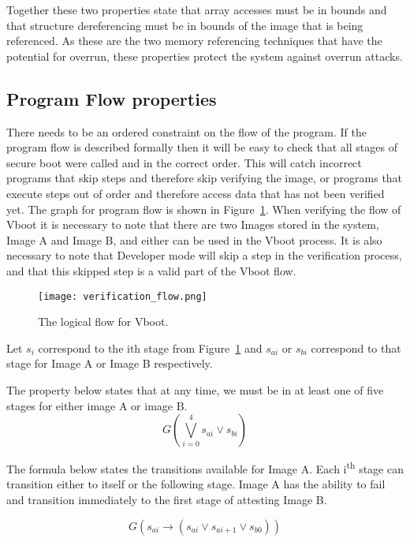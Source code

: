 Together these two properties state that array accesses must be in bounds and that structure dereferencing must be in bounds of the image that is being referenced.
As these are the two memory referencing techniques that have the potential for overrun, these properties protect the system against overrun attacks.

\subsection{Program Flow properties}


There needs to be an ordered constraint on the flow of the program. 
If the program flow is described formally then it will be easy to check that all stages of secure boot were called and in the correct order.
This will catch incorrect programs that skip steps and therefore skip verifying the image, or programs that execute steps out of order and therefore access data that has not been verified yet.
The graph for program flow is shown in Figure~\ref{fig:v_flow}.
When verifying the flow of Vboot it is necessary to note that there are two Images stored in the system, Image A and Image B, and either can be used in the Vboot process. 
It is also necessary to note that Developer mode will skip a step in the verification process, and that this skipped step is a valid part of the Vboot flow.

\begin{figure}[!htbp]
  \centering
  \texttt{[image: verification\_flow.png]}
  \caption[Verified Boot Program Flow]{The logical flow for Vboot.}\label{fig:v_flow}
\end{figure}

Let $s_i$ correspond to the ith stage from Figure~\ref{fig:v_flow} and $s_{ai}$ or $s_{bi}$ correspond to that stage for Image A or Image B respectively.

The property below states that at any time, we must be in at least one of five stages for either image A or image B.
\begin{equation}
    G(\bigvee\limits_{i = 0}^{4} s_{ai} \lor s_{bi})
\end{equation}

The formula below states the transitions available for Image A.
Each i\textsuperscript{th} stage can transition either to itself or the following stage.
Image A has the ability to fail and transition immediately to the first stage of attesting Image B.

\begin{equation}
    G(s_{ai} \to (s_{ai} \lor s_{ai+1} \lor s_{b0}))
\end{equation}

